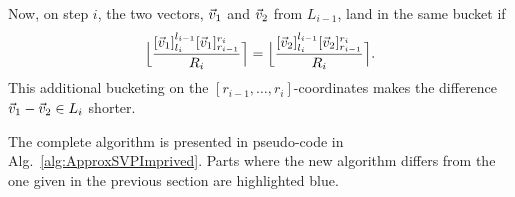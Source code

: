Now, on step $i$, the two vectors, $\vvec_1$ and $\vvec_2$ from $L_{i-1}$, land in the same bucket if
\[
	\Big\lfloor \frac{[\vvec_1]_{l_i}^{l_{i-1}} [\vvec_1]_{r_{i-1}}^{r_i}}{R_i} \Big\rceil =
	\Big\lfloor \frac{[\vvec_2]_{l_i}^{l_{i-1}} [\vvec_2]_{r_{i-1}}^{r_i}}{R_i} \Big\rceil. 
\]
This additional bucketing on the $[r_{i-1}, \ldots, r_{i}]$-coordinates makes the difference $\vvec_1 - \vvec_2 \in L_{i}$ shorter.

The complete algorithm is presented in pseudo-code in Alg.~\ref{alg:ApproxSVPImprived}. Parts where the new algorithm differs from the one given in the previous section are highlighted blue.
